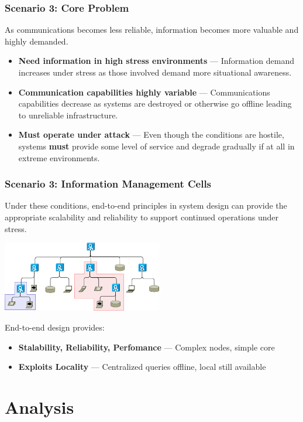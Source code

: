 \documentclass[t,handout, 10pt]{beamer}
\begin{document}
\begin{frame}
\frametitle{Scenario 3: Core Problem}
As communications becomes less reliable, information becomes more valuable and highly demanded.
\newline
\pause
\begin{itemize}
\item \textbf{Need information in high stress environments} --- Information demand increases under stress as those involved demand more situational awareness.
\pause
\item \textbf{Communication capabilities highly variable} --- Communications capabilities decrease as systems are destroyed or otherwise go offline leading to unreliable infrastructure.
\pause
\item \textbf{Must operate under attack} --- Even though the conditions are hostile, systems \textbf{must} provide some level of service and degrade gradually if at all in extreme environments.
\end{itemize}
\end{frame}

\begin{frame}
\frametitle{Scenario 3: Information Management Cells}
Under these conditions, end-to-end principles in system design can provide the appropriate scalability and reliability to support continued operations under stress.  
\begin{center}
\includegraphics[width=7cm]{info-cells}
\end{center}
End-to-end design provides:
\begin{itemize}
\item \textbf{Stalability, Reliability, Perfomance} --- Complex nodes, simple core
\item \textbf{Exploits Locality} --- Centralized queries offline, local still available
\end{itemize}
\end{frame}

\section{Analysis}
\end{document}
